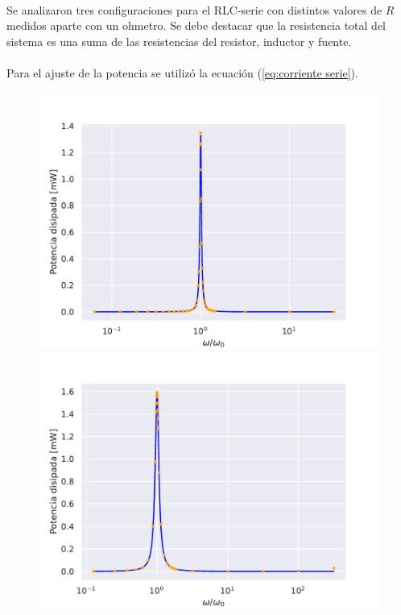 \paragraph{} Se analizaron tres configuraciones para el RLC-serie con distintos valores de $R$ medidos aparte con un ohmetro. Se debe destacar que la resistencia total del sistema es una suma de las resistencias del resistor, inductor y fuente.



\paragraph{}Para el ajuste de la potencia se utilizó la ecuación (\ref{eq:corriente serie}).

\begin{figure} [H]
    \centering
    \includegraphics[scale=0.5]{figuras/RLC-SERIE-1/potencia.pdf}
    \includegraphics[scale=0.5]{figuras/RLC-SERIE-2/potencia.pdf}

\end{figure}
